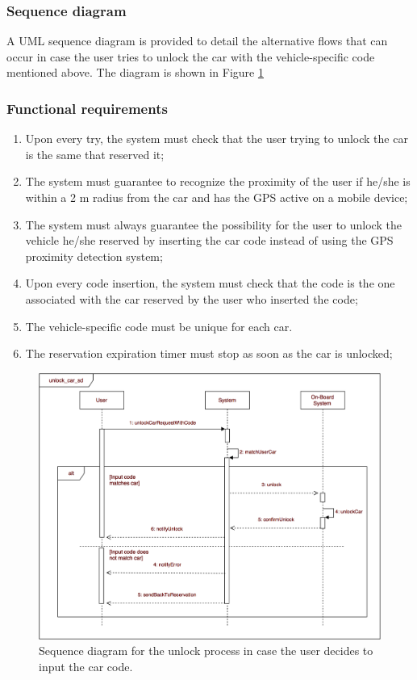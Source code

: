 \subsubsection{Sequence diagram}
A UML sequence diagram is provided to detail the alternative flows that can occur in case the user tries to unlock the car with the vehicle-specific code mentioned above. The diagram is shown in Figure \ref{unlock_sd}

\subsubsection{Functional requirements}
\begin{enumerate}
\item Upon every try, the system must check that the user trying to unlock the car is the same that reserved it;
\item The system must guarantee to recognize the proximity of the user if he/she is within a 2 m radius from the car and has the GPS active on a mobile device;
\item The system must always guarantee the possibility for the user to unlock the vehicle he/she reserved by inserting the car code instead of using the GPS proximity detection system;
\item Upon every code insertion, the system must check that the code is the one associated with the car reserved by the user who inserted the code;
\item The vehicle-specific code must be unique for each car.
\item The reservation expiration timer must stop as soon as the car is unlocked;
\end{enumerate}

\begin{figure}[H]
\begin{center}
		\includegraphics[width=\textwidth]{./specific_requirements/features/diagrams/unlock_car_sd.png}
		\caption{Sequence diagram for the unlock process in case the user decides to input the car code.}
		\label{unlock_sd}
\end{center}
\end{figure}

